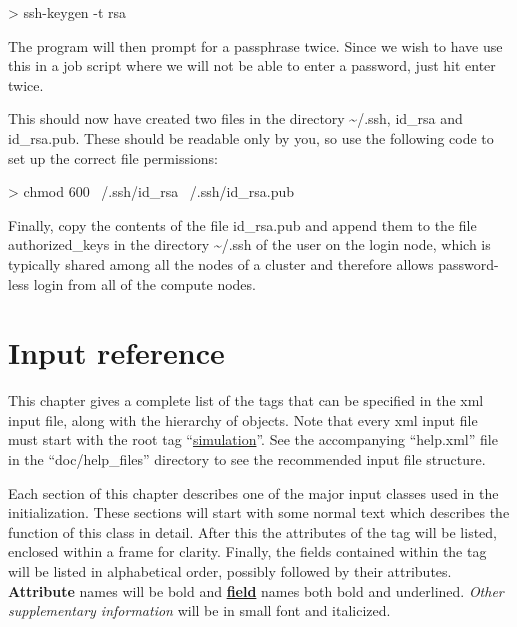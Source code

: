 \documentclass[11pt,english,fleqn]{report}
\newenvironment{code}{%
\footnotesize
\verbatim
}{
\endverbatim
\normalsize
}
\begin{document}
\begin{code}
> ssh-keygen -t rsa
\end{code}

\noindent The program will then prompt for a passphrase twice. Since we wish to have
use this in a job script where we will not be able to enter a password,
just hit enter twice.

This should now have created two files in the directory \textasciitilde{}/.ssh,
id\_rsa and id\_rsa.pub. These should be readable only by you, so
use the following code to set up the correct file permissions:

\begin{code}
> chmod 600 ~/.ssh/id_rsa ~/.ssh/id_rsa.pub
\end{code}

\noindent Finally, copy the contents of the file id\_rsa.pub and append them
to the file authorized\_keys in the directory \textasciitilde{}/.ssh
of the user on the login node, which is typically shared among all
the nodes of a cluster and therefore allows password-less login
from all of the compute nodes.


\chapter{Input reference}

\label{hierarchy}

This chapter gives a complete list of the tags that can be
specified in the xml input file, along with the hierarchy of objects.
Note that every xml input file must start with the root tag
{}``\hyperref[SIMULATION]{simulation}''.
See the accompanying {}``help.xml'' file in the {}``doc/help\_files'' directory
to see the recommended input file structure.

Each section of this chapter describes one of the major input classes
used in the \ipi initialization. These sections will start with some normal
text which describes the function of this class in detail.
After this the attributes of the tag will be listed, enclosed within
a frame for clarity.
Finally, the fields contained within the tag will be listed in alphabetical order,
possibly followed by their attributes.
\textbf{Attribute} names will be bold and
\textbf{\underline{field}} names both bold and underlined.
\emph{\small Other supplementary information} will be in small font and italicized.
\end{document}
